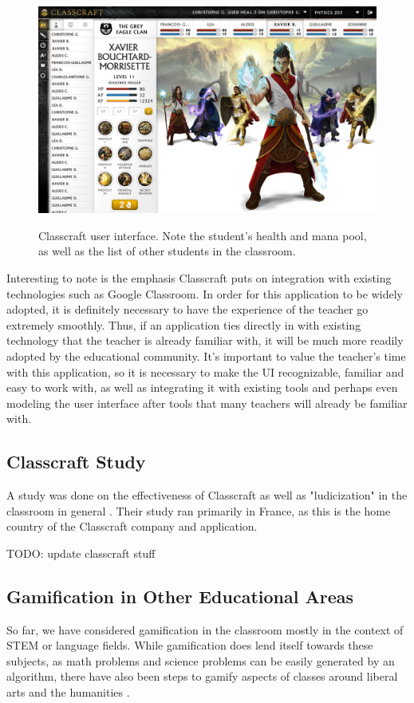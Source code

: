 \begin{figure}[h]
	\includegraphics[width=1.0\linewidth]{figures/classcraft}
	\caption{Classcraft user interface. Note the student's health and mana pool, as well as the list of other students in the classroom.}
	\label{fig:classcraft}
	\cite{hardy_heyes_1999}
\end{figure}

Interesting to note is the emphasis Classcraft puts on integration with existing technologies such as Google Classroom. In order for this application to be widely adopted, it is definitely necessary to have the experience of the teacher go extremely smoothly. Thus, if an application ties directly in with existing technology that the teacher is already familiar with, it will be much more readily adopted by the educational community. It's important to value the teacher's time with this application, so it is necessary to make the UI recognizable, familiar and easy to work with, as well as integrating it with existing tools and perhaps even modeling the user interface after tools that many teachers will already be familiar with.

\subsection{Classcraft Study}
A study was done on the effectiveness of Classcraft as well as "ludicization" in the classroom in general \cite{sanchez2016classcraft}. Their study ran primarily in France, as this is the home country of the Classcraft company and application.

TODO: update classcraft stuff

\subsection{Gamification in Other Educational Areas}
So far, we have considered gamification in the classroom mostly in the context of STEM or language fields. While gamification does lend itself towards these subjects, as math problems and science problems can be easily generated by an algorithm, there have also been steps to gamify aspects of classes around liberal arts and the humanities \cite{wagner2017digital}. 

